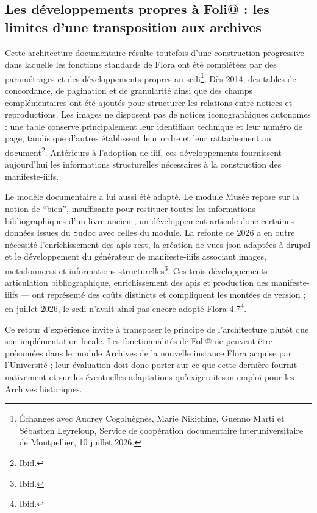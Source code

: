 \subsection{Les développements propres à Foli@ : les limites d'une transposition aux archives}

Cette \gls{architecture-documentaire} résulte toutefois d'une construction progressive dans laquelle les fonctions standards de Flora ont été complétées par des paramétrages et des développements propres au \gls{scdi}\footnote{Échanges avec Audrey Cogoluègnès, Marie Nikichine, Guenno Marti et Sébastien Leyreloup, Service de coopération documentaire interuniversitaire de Montpellier, 10 juillet 2026.}. Dès 2014, des tables de concordance, de pagination et de granularité ainsi que des champs complémentaires ont été ajoutés pour structurer les relations entre notices et reproductions. Les images ne disposent pas de notices iconographiques autonomes : une table conserve principalement leur identifiant technique et leur numéro de page, tandis que d'autres établissent leur ordre et leur rattachement au document\footnote{Ibid.}. Antérieurs à l'adoption de \gls{iiif}, ces développements fournissent aujourd'hui les informations structurelles nécessaires à la construction des \glspl{manifeste-iiif}.

Le modèle documentaire a lui aussi été adapté. Le module Musée repose sur la notion de \enquote{bien}, insuffisante pour restituer toutes les informations bibliographiques d'un livre ancien ; un développement articule donc certaines données issues du Sudoc avec celles du module. La refonte de 2026 a en outre nécessité l'enrichissement des \glspl{api} \gls{rest}, la création de vues \gls{json} adaptées à \gls{drupal} et le développement du générateur de \glspl{manifeste-iiif} associant images, \glspl{metadonnees} et informations structurelles\footnote{Ibid.}. Ces trois développements --- articulation bibliographique, enrichissement des \glspl{api} et production des \glspl{manifeste-iiif} --- ont représenté des coûts distincts et compliquent les montées de version ; en juillet 2026, le \gls{scdi} n'avait ainsi pas encore adopté Flora 4.7\footnote{Ibid.}.

Ce retour d'expérience invite à transposer le principe de l'architecture plutôt que son implémentation locale. Les fonctionnalités de Foli@ ne peuvent être présumées dans le module Archives de la nouvelle instance Flora acquise par l'Université ; leur évaluation doit donc porter sur ce que cette dernière fournit nativement et sur les éventuelles adaptations qu'exigerait son emploi pour les Archives historiques.


